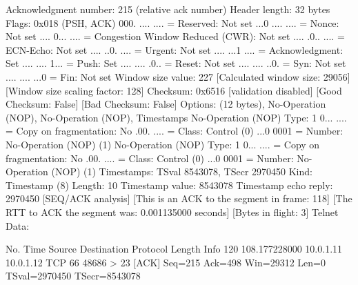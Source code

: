     Acknowledgment number: 215    (relative ack number)
    Header length: 32 bytes
    Flags: 0x018 (PSH, ACK)
        000. .... .... = Reserved: Not set
        ...0 .... .... = Nonce: Not set
        .... 0... .... = Congestion Window Reduced (CWR): Not set
        .... .0.. .... = ECN-Echo: Not set
        .... ..0. .... = Urgent: Not set
        .... ...1 .... = Acknowledgment: Set
        .... .... 1... = Push: Set
        .... .... .0.. = Reset: Not set
        .... .... ..0. = Syn: Not set
        .... .... ...0 = Fin: Not set
    Window size value: 227
    [Calculated window size: 29056]
    [Window size scaling factor: 128]
    Checksum: 0x6516 [validation disabled]
        [Good Checksum: False]
        [Bad Checksum: False]
    Options: (12 bytes), No-Operation (NOP), No-Operation (NOP), Timestamps
        No-Operation (NOP)
            Type: 1
                0... .... = Copy on fragmentation: No
                .00. .... = Class: Control (0)
                ...0 0001 = Number: No-Operation (NOP) (1)
        No-Operation (NOP)
            Type: 1
                0... .... = Copy on fragmentation: No
                .00. .... = Class: Control (0)
                ...0 0001 = Number: No-Operation (NOP) (1)
        Timestamps: TSval 8543078, TSecr 2970450
            Kind: Timestamp (8)
            Length: 10
            Timestamp value: 8543078
            Timestamp echo reply: 2970450
    [SEQ/ACK analysis]
        [This is an ACK to the segment in frame: 118]
        [The RTT to ACK the segment was: 0.001135000 seconds]
        [Bytes in flight: 3]
Telnet
    Data: 

No.     Time           Source                Destination           Protocol Length Info
    120 108.177228000  10.0.1.11             10.0.1.12             TCP      66     48686 > 23 [ACK] Seq=215 Ack=498 Win=29312 Len=0 TSval=2970450 TSecr=8543078

